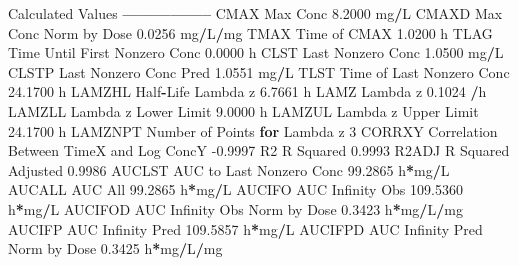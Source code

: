 \documentclass[12pt,]{krantz}
\newenvironment{Shaded}{\begin{snugshade}}{\end{snugshade}}
\newcommand{\ControlFlowTok}[1]{\textcolor[rgb]{0.13,0.29,0.53}{\textbf{#1}}}
\newcommand{\DecValTok}[1]{\textcolor[rgb]{0.00,0.00,0.81}{#1}}
\newcommand{\FloatTok}[1]{\textcolor[rgb]{0.00,0.00,0.81}{#1}}
\newcommand{\NormalTok}[1]{#1}
\newcommand{\OperatorTok}[1]{\textcolor[rgb]{0.81,0.36,0.00}{\textbf{#1}}}
\begin{document}
\begin{Shaded}
\begin{Highlighting}[]
{{{{{{{{{{{{{{{{\NormalTok{Calculated Values}
\OperatorTok{-----------------}
\NormalTok{CMAX       Max Conc                                        }\FloatTok{8.2000}\NormalTok{ mg}\OperatorTok{/}\NormalTok{L}
\NormalTok{CMAXD      Max Conc Norm by Dose                           }\FloatTok{0.0256}\NormalTok{ mg}\OperatorTok{/}\NormalTok{L}\OperatorTok{/}\NormalTok{mg}
\NormalTok{TMAX       Time of CMAX                                    }\FloatTok{1.0200}\NormalTok{ h}
\NormalTok{TLAG       Time Until First Nonzero Conc                   }\FloatTok{0.0000}\NormalTok{ h}
\NormalTok{CLST       Last Nonzero Conc                               }\FloatTok{1.0500}\NormalTok{ mg}\OperatorTok{/}\NormalTok{L}
\NormalTok{CLSTP      Last Nonzero Conc Pred                          }\FloatTok{1.0551}\NormalTok{ mg}\OperatorTok{/}\NormalTok{L}
\NormalTok{TLST       Time of Last Nonzero Conc                      }\FloatTok{24.1700}\NormalTok{ h}
\NormalTok{LAMZHL     Half}\OperatorTok{-}\NormalTok{Life Lambda z                              }\FloatTok{6.7661}\NormalTok{ h}
\NormalTok{LAMZ       Lambda z                                        }\FloatTok{0.1024} \OperatorTok{/}\NormalTok{h}
\NormalTok{LAMZLL     Lambda z Lower Limit                            }\FloatTok{9.0000}\NormalTok{ h}
\NormalTok{LAMZUL     Lambda z Upper Limit                           }\FloatTok{24.1700}\NormalTok{ h}
\NormalTok{LAMZNPT    Number of Points }\ControlFlowTok{for}\NormalTok{ Lambda z                   }\DecValTok{3}
\NormalTok{CORRXY     Correlation Between TimeX and Log ConcY        }\FloatTok{-0.9997} 
\NormalTok{R2         R Squared                                       }\FloatTok{0.9993} 
\NormalTok{R2ADJ      R Squared Adjusted                              }\FloatTok{0.9986} 
\NormalTok{AUCLST     AUC to Last Nonzero Conc                       }\FloatTok{99.2865}\NormalTok{ h}\OperatorTok{*}\NormalTok{mg}\OperatorTok{/}\NormalTok{L}
\NormalTok{AUCALL     AUC All                                        }\FloatTok{99.2865}\NormalTok{ h}\OperatorTok{*}\NormalTok{mg}\OperatorTok{/}\NormalTok{L}
\NormalTok{AUCIFO     AUC Infinity Obs                              }\FloatTok{109.5360}\NormalTok{ h}\OperatorTok{*}\NormalTok{mg}\OperatorTok{/}\NormalTok{L}
\NormalTok{AUCIFOD    AUC Infinity Obs Norm by Dose                   }\FloatTok{0.3423}\NormalTok{ h}\OperatorTok{*}\NormalTok{mg}\OperatorTok{/}\NormalTok{L}\OperatorTok{/}\NormalTok{mg}
\NormalTok{AUCIFP     AUC Infinity Pred                             }\FloatTok{109.5857}\NormalTok{ h}\OperatorTok{*}\NormalTok{mg}\OperatorTok{/}\NormalTok{L}
\NormalTok{AUCIFPD    AUC Infinity Pred Norm by Dose                  }\FloatTok{0.3425}\NormalTok{ h}\OperatorTok{*}\NormalTok{mg}\OperatorTok{/}\NormalTok{L}\OperatorTok{/}\NormalTok{mg}
}}}}}}}}}}}}}}}}
\end{Highlighting}
\end{Shaded}
\end{document}
